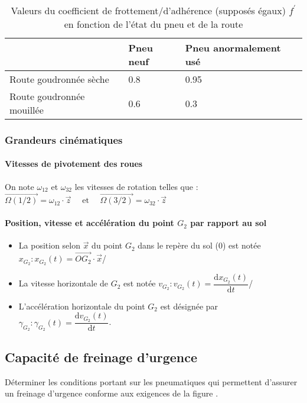 \begin{table}[!h]
\centering
\begin{tabular}{lll}
 & \textbf{Pneu neuf} & \textbf{Pneu anormalement usé} \\
\hline
Route goudronnée sèche & 0.8 & 0.95 \\
Route goudronnée mouillée & 0.6 & 0.3 \\
\hline
\end{tabular}
\caption{Valeurs du coefficient de frottement/d'adhérence (supposés égaux) \(f^{\prime}\) en fonction de l'état du pneu et de la route \label{tab_33}}
\end{table}


\subsubsection{Grandeurs cinématiques}
\paragraph*{Vitesses de pivotement des roues} On note \(\omega_{12}\) et \(\omega_{32}\) les vitesses de rotation telles que :
$
\overrightarrow{\Omega(1 / 2)}=\omega_{12} \cdot \vec{z} \quad \text { et } \quad \overrightarrow{\Omega(3 / 2)}=\omega_{32} \cdot \vec{z}
$

\paragraph*{Position, vitesse et accélération du point \(G_{2}\) par rapport au sol}
\begin{itemize}
\item La position selon \(\vec{x}\) du point \(G_{2}\) dans le repère du sol (0) est notée \(x_{G_{2}}: x_{G_{2}}(t)=\overrightarrow{O G_{2}} \cdot \vec{x}\)/
  \item La vitesse horizontale de \(G_{2}\) est notée \(v_{G_{2}}: v_{G_{2}}(t)=\dfrac{\mathrm{d} x_{G_{2}}(t)}{\mathrm{d} t}\)/
  \item L'accélération horizontale du point \(G_{2}\) est désignée par \(\gamma_{G_{2}}: \gamma_{G_{2}}(t)=\dfrac{\mathrm{d} v_{G_{2}}(t)}{\mathrm{d} t}\).
\end{itemize}

\subsection{Capacité de freinage d'urgence}
\begin{obj}
Déterminer les conditions portant sur les pneumatiques qui permettent d'assurer un freinage d'urgence conforme aux exigences de la figure \label{fig_31}.
\end{obj}

